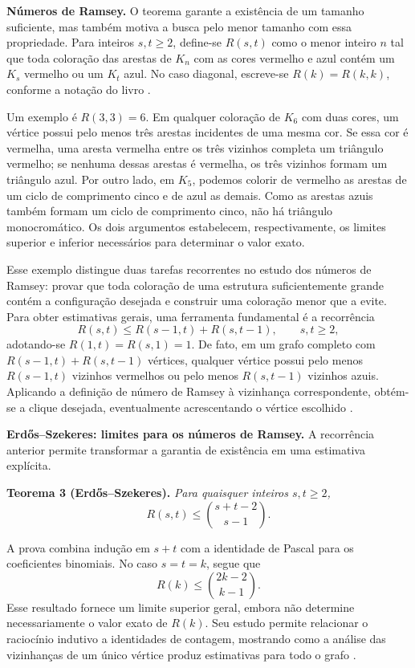 \medskip
\noindent\textbf{Números de Ramsey.}
O teorema garante a existência de um tamanho suficiente, mas também motiva a busca pelo menor tamanho com essa propriedade. Para inteiros $s,t\geq 2$, define-se $R(s,t)$ como o menor inteiro $n$ tal que toda coloração das arestas de $K_n$ com as cores vermelho e azul contém um $K_s$ vermelho ou um $K_t$ azul. No caso diagonal, escreve-se $R(k)=R(k,k)$, conforme a notação do livro \cite[Seção 4.1]{impa}.

Um exemplo é $R(3,3)=6$. Em qualquer coloração de $K_6$ com duas cores, um vértice possui pelo menos três arestas incidentes de uma mesma cor. Se essa cor é vermelha, uma aresta vermelha entre os três vizinhos completa um triângulo vermelho; se nenhuma dessas arestas é vermelha, os três vizinhos formam um triângulo azul. Por outro lado, em $K_5$, podemos colorir de vermelho as arestas de um ciclo de comprimento cinco e de azul as demais. Como as arestas azuis também formam um ciclo de comprimento cinco, não há triângulo monocromático. Os dois argumentos estabelecem, respectivamente, os limites superior e inferior necessários para determinar o valor exato.

Esse exemplo distingue duas tarefas recorrentes no estudo dos números de Ramsey: provar que toda coloração de uma estrutura suficientemente grande contém a configuração desejada e construir uma coloração menor que a evite. Para obter estimativas gerais, uma ferramenta fundamental é a recorrência
\[
    R(s,t)\leq R(s-1,t)+R(s,t-1), \qquad s,t\geq 2,
\]
adotando-se $R(1,t)=R(s,1)=1$. De fato, em um grafo completo com $R(s-1,t)+R(s,t-1)$ vértices, qualquer vértice possui pelo menos $R(s-1,t)$ vizinhos vermelhos ou pelo menos $R(s,t-1)$ vizinhos azuis. Aplicando a definição de número de Ramsey à vizinhança correspondente, obtém-se a clique desejada, eventualmente acrescentando o vértice escolhido \cite[Lema 4.1.3]{impa}.

\medskip
\noindent\textbf{Erd\H{o}s--Szekeres: limites para os números de Ramsey.}
A recorrência anterior permite transformar a garantia de existência em uma estimativa explícita.

\smallskip
\noindent\textbf{Teorema 3 (Erd\H{o}s--Szekeres).} \textit{Para quaisquer inteiros $s,t\geq 2$,
\[
    R(s,t)\leq \binom{s+t-2}{s-1}.
\]}

A prova combina indução em $s+t$ com a identidade de Pascal para os coeficientes binomiais. No caso $s=t=k$, segue que
\[
    R(k)\leq \binom{2k-2}{k-1}.
\]
Esse resultado fornece um limite superior geral, embora não determine necessariamente o valor exato de $R(k)$. Seu estudo permite relacionar o raciocínio indutivo a identidades de contagem, mostrando como a análise das vizinhanças de um único vértice produz estimativas para todo o grafo \cite[Teoremas 4.1.2 e 4.1.4]{impa}.

